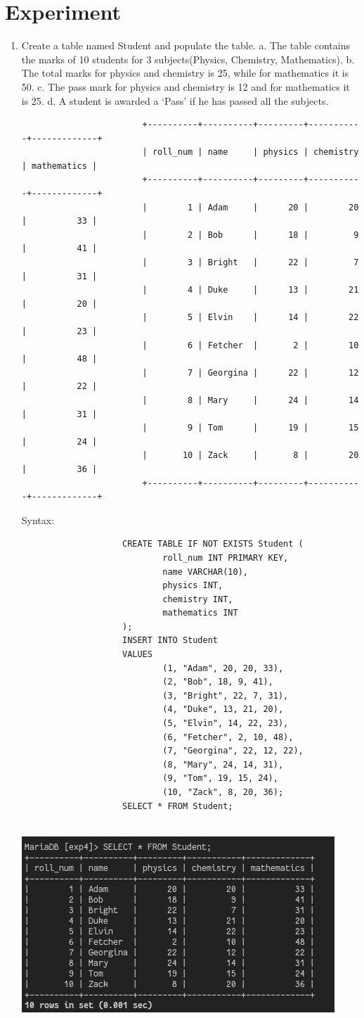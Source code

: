 \documentclass[13pt,oneside]{book}
\begin{document}
			\section*{Experiment}
				\begin{enumerate}
					\item
					Create a table named Student and populate the table. 
							a. The table contains the marks of 10 students for 3 subjects(Physics, Chemistry, 
					 Mathematics). 
							b. The total marks for physics and chemistry is 25, while for mathematics it is 50. 
							c. The pass mark for physics and chemistry is 12 and for mathematics it is 25. 
							d. A student is awarded a ‘Pass’ if he has passed all the subjects.
					\begin{verbatim}
						+----------+----------+---------+-----------+-------------+
						| roll_num | name     | physics | chemistry | mathematics |
						+----------+----------+---------+-----------+-------------+
						|        1 | Adam     |      20 |        20 |          33 |
						|        2 | Bob      |      18 |         9 |          41 |
						|        3 | Bright   |      22 |         7 |          31 |
						|        4 | Duke     |      13 |        21 |          20 |
						|        5 | Elvin    |      14 |        22 |          23 |
						|        6 | Fetcher  |       2 |        10 |          48 |
						|        7 | Georgina |      22 |        12 |          22 |
						|        8 | Mary     |      24 |        14 |          31 |
						|        9 | Tom      |      19 |        15 |          24 |
						|       10 | Zack     |       8 |        20 |          36 |
						+----------+----------+---------+-----------+-------------+
					\end{verbatim}
					 
					Syntax:
					\begin{verbatim}
					CREATE TABLE IF NOT EXISTS Student (
							roll_num INT PRIMARY KEY,
							name VARCHAR(10),
							physics INT,
							chemistry INT,
							mathematics INT
					);
					INSERT INTO Student 
					VALUES
							(1, "Adam", 20, 20, 33), 
							(2, "Bob", 18, 9, 41), 
							(3, "Bright", 22, 7, 31),
							(4, "Duke", 13, 21, 20),
							(5, "Elvin", 14, 22, 23),
							(6, "Fetcher", 2, 10, 48),
							(7, "Georgina", 22, 12, 22), 
							(8, "Mary", 24, 14, 31),
							(9, "Tom", 19, 15, 24),
							(10, "Zack", 8, 20, 36);
					SELECT * FROM Student;
					
					\end{verbatim}
					\includegraphics[]{img/p4/ss1.png}
					

\end{enumerate}
\end{document}
